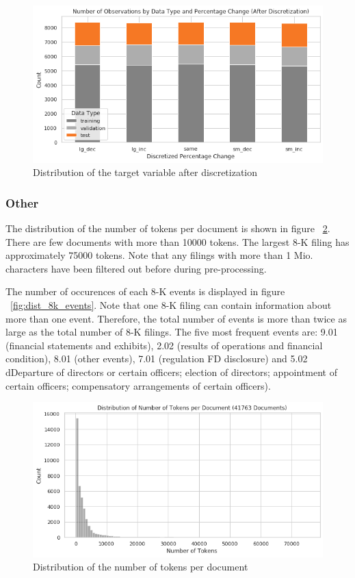 \documentclass{article}
\begin{document}
	\begin{figure}[h!]
	\includegraphics[width=\linewidth]{img/dist_target_disc.png}
	\caption{Distribution of the target variable after discretization}
	\label{fig:dist_target_disc}
	\end{figure}


	\subsubsection{Other}
	
	The distribution of the number of tokens per document is shown in figure ~\ref{fig:dist_num_tokens}. There are few documents with more than 10000 tokens. The largest 8-K filing has approximately 75000 tokens. Note that any filings with more than 1 Mio. characters have been filtered out before during pre-processing.
	
	The number of occurences of each 8-K events is displayed in figure ~\ref{fig:dist_8k_events}. Note that one 8-K filing can contain information about more than one event. Therefore, the total number of events is more than twice as large as the total number of 8-K filings. The five most frequent events are: 9.01 (financial statements and exhibits), 2.02 (results of operations and financial condition), 8.01 (other events), 7.01 (regulation FD disclosure) and 5.02 dDeparture of directors or certain officers; election of directors; appointment of certain officers; compensatory arrangements of certain officers).

	\begin{figure}[h!]
		\includegraphics[width=\linewidth]{img/dist_num_tokens.png}
		\caption{Distribution of the number of tokens per document}
		\label{fig:dist_num_tokens}
	\end{figure}
\end{document}
